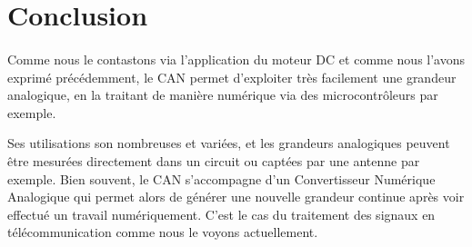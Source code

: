 \section{Conclusion}

\paragraph{}

Comme nous le contastons via l'application du moteur DC et comme nous l'avons exprimé précédemment, le CAN permet d'exploiter très facilement une grandeur analogique, en la traitant de manière numérique via des microcontrôleurs par exemple.

Ses utilisations son nombreuses et variées, et les grandeurs analogiques peuvent être mesurées directement dans un circuit ou captées par une antenne par exemple. Bien souvent, le CAN s'accompagne d'un Convertisseur Numérique Analogique qui permet alors de générer une nouvelle grandeur continue après voir  effectué un travail numériquement. C'est le cas du traitement des signaux en télécommunication comme nous le voyons actuellement.